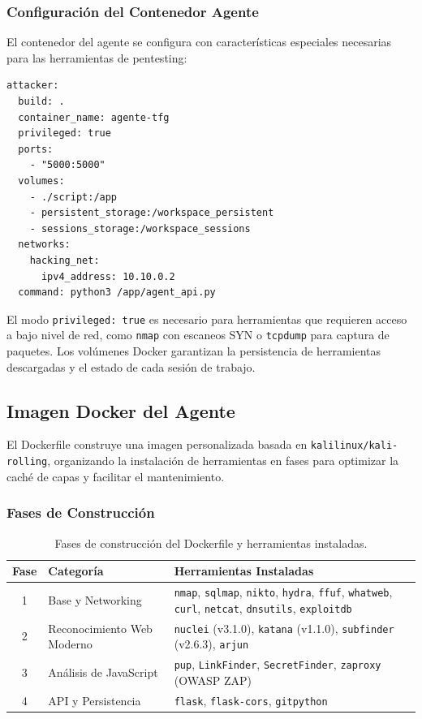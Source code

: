 \subsubsection{Configuración del Contenedor Agente}

El contenedor del agente se configura con características especiales necesarias para las herramientas de pentesting:

\begin{verbatim}
attacker:
  build: .
  container_name: agente-tfg
  privileged: true
  ports:
    - "5000:5000"
  volumes:
    - ./script:/app
    - persistent_storage:/workspace_persistent
    - sessions_storage:/workspace_sessions
  networks:
    hacking_net:
      ipv4_address: 10.10.0.2
  command: python3 /app/agent_api.py
\end{verbatim}

El modo \texttt{privileged: true} es necesario para herramientas que requieren acceso a bajo nivel de red, como \texttt{nmap} con escaneos SYN o \texttt{tcpdump} para captura de paquetes. Los volúmenes Docker garantizan la persistencia de herramientas descargadas y el estado de cada sesión de trabajo.

\subsection{Imagen Docker del Agente}

El Dockerfile construye una imagen personalizada basada en \texttt{kalilinux/kali-rolling}, organizando la instalación de herramientas en fases para optimizar la caché de capas y facilitar el mantenimiento.

\subsubsection{Fases de Construcción}

\begin{table}[H]
\centering
\renewcommand{\arraystretch}{1.2}
\small
\begin{tabular}{|c|p{3.5cm}|p{7cm}|}
\hline
\rowcolor[gray]{0.85}
\textbf{Fase} & \textbf{Categoría} & \textbf{Herramientas Instaladas} \\
\hline
1 & Base y Networking & \texttt{nmap}, \texttt{sqlmap}, \texttt{nikto}, \texttt{hydra}, \texttt{ffuf}, \texttt{whatweb}, \texttt{curl}, \texttt{netcat}, \texttt{dnsutils}, \texttt{exploitdb} \\
\hline
2 & Reconocimiento Web Moderno & \texttt{nuclei} (v3.1.0), \texttt{katana} (v1.1.0), \texttt{subfinder} (v2.6.3), \texttt{arjun} \\
\hline
3 & Análisis de JavaScript & \texttt{pup}, \texttt{LinkFinder}, \texttt{SecretFinder}, \texttt{zaproxy} (OWASP ZAP) \\
\hline
4 & API y Persistencia & \texttt{flask}, \texttt{flask-cors}, \texttt{gitpython} \\
\hline
\end{tabular}
\caption{Fases de construcción del Dockerfile y herramientas instaladas.}
\label{tab:dockerfile_fases}
\end{table}

